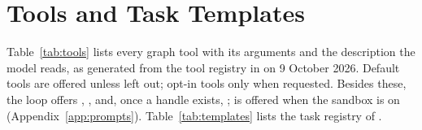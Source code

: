 \chapter{Tools and Task Templates}
\label{app:tools}

Table~\ref{tab:tools} lists every graph tool with its arguments and the description the model reads, as generated
from the tool registry in  on 9 October 2026. Default tools are offered unless left
out; opt-in tools only when requested. Besides these, the loop offers , , and,
once a handle exists, ;  is offered when the sandbox is
on (Appendix~\ref{app:prompts}). Table~\ref{tab:templates} lists the task registry of .

